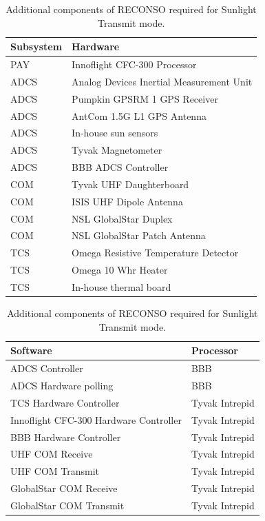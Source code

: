\documentclass{article}
\begin{document}
\begin{table}[h!]
\caption{Additional components of RECONSO required for Sunlight Transmit mode.}
\begin{adjustbox}{center}
\begin{tabular}{|l|l|}
\hline
Subsystem & Hardware \\ \hline \hline
PAY & Innoflight CFC-300 Processor  \\ \hline \hline
ADCS & Analog Devices Inertial Measurement Unit  \\ \hline
ADCS & Pumpkin GPSRM 1 GPS Receiver \\ \hline
ADCS & AntCom 1.5G L1 GPS Antenna  \\ \hline
ADCS & In-house sun sensors  \\ \hline
ADCS & Tyvak Magnetometer \\ \hline
ADCS & BBB ADCS Controller \\ \hline \hline
COM & Tyvak UHF Daughterboard  \\ \hline
COM & ISIS UHF Dipole Antenna  \\ \hline
COM & NSL GlobalStar Duplex  \\ \hline
COM & NSL GlobalStar Patch Antenna \\ \hline \hline
TCS & Omega Resistive Temperature Detector \\ \hline
TCS & Omega 10 Whr Heater  \\ \hline
TCS & In-house thermal board \\ \hline
\end{tabular}

\quad

\begin{tabular}{|l|l|}
\hline
Software & Processor \\ \hline \hline
ADCS Controller & BBB \\ \hline
ADCS Hardware polling & BBB \\ \hline \hline
TCS Hardware Controller & Tyvak Intrepid \\ \hline
Innoflight CFC-300 Hardware Controller & Tyvak Intrepid \\ \hline
BBB Hardware Controller & Tyvak Intrepid \\ \hline
UHF COM Receive & Tyvak Intrepid \\ \hline
UHF COM Transmit & Tyvak Intrepid \\ \hline
GlobalStar COM Receive & Tyvak Intrepid \\ \hline
GlobalStar COM Transmit & Tyvak Intrepid \\ \hline
\end{tabular}
\end{adjustbox}
\end{table}
\end{document}

